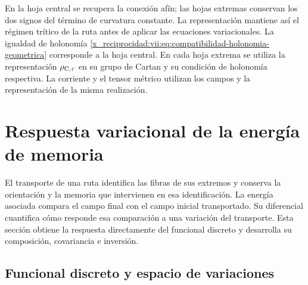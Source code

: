 En la hoja central se recupera la conexión afín; las hojas extremas
conservan los dos signos del término de curvatura constante. La
representación mantiene así el régimen trítico de la ruta antes de
aplicar las ecuaciones variacionales. La igualdad de holonomía
\eqref{x_reciprocidad:vii:eq:compatibilidad-holonomia-geometrica} corresponde a la
hoja central. En cada hoja extrema se utiliza la representación
\(\rho_{{\rm C},\tau}\) en su grupo de Cartan y su condición
de holonomía respectiva. La corriente y el tensor métrico utilizan
los campos y la representación de la misma realización.




\chapter{Respuesta variacional de la energía de memoria}
\label{x_reciprocidad:vii:sec:variacion-memoria}

El transporte de una ruta identifica las fibras de sus extremos y conserva
la orientación y la memoria que intervienen en esa identificación. La energía
asociada compara el campo final con el campo inicial transportado. Su
diferencial cuantifica cómo responde esa comparación a una variación del
transporte. Esta sección obtiene la respuesta directamente del funcional
discreto y desarrolla su composición, covariancia e inversión.

\section{Funcional discreto y espacio de variaciones}
\label{x_reciprocidad:vii:subsec:funcional-memoria}


